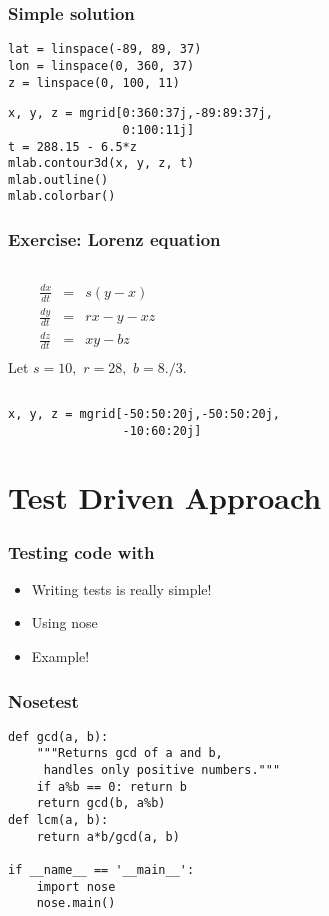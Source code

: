 \documentclass[compress,14pt]{beamer}
\newcounter{time}
\newcommand{\inctime}[1]{\addtocounter{time}{#1}{\vspace*{0.1in}\tiny \thetime\ m}}
\begin{document}
\begin{frame}[fragile]
    \frametitle{Simple solution}

    \begin{lstlisting}
lat = linspace(-89, 89, 37)
lon = linspace(0, 360, 37)
z = linspace(0, 100, 11)
    \end{lstlisting}
\pause
    \begin{lstlisting}
x, y, z = mgrid[0:360:37j,-89:89:37j,
                0:100:11j]
t = 288.15 - 6.5*z
mlab.contour3d(x, y, z, t)
mlab.outline()
mlab.colorbar()
    \end{lstlisting}
\end{frame}

\begin{frame}[fragile]
    \frametitle{Exercise: Lorenz equation}
    \begin{columns}
        \begin{eqnarray*}
        \frac{d x}{dt} &=& s (y-x)\\
        \frac{d y}{d t} &=& rx -y -xz\\
        \frac{d z}{d t} &=& xy - bz\\
        \end{eqnarray*}
        Let $s=10,$
        $r=28,$ 
        $b=8./3.$
    \end{columns}
  \begin{lstlisting}
x, y, z = mgrid[-50:50:20j,-50:50:20j,
                -10:60:20j]
  \end{lstlisting}
\inctime{20}
\end{frame}

\section{Test Driven Approach}

\begin{frame}[fragile]
    \frametitle{Testing code with }
   
    \begin{itemize}
        \item Writing tests is really simple!

        \item Using nose

        \item Example!
    \end{itemize}
\end{frame}

\begin{frame}[fragile]
    \frametitle{Nosetest}
\begin{lstlisting}
def gcd(a, b):
    """Returns gcd of a and b, 
     handles only positive numbers."""
    if a%b == 0: return b
    return gcd(b, a%b)
def lcm(a, b):
    return a*b/gcd(a, b)

if __name__ == '__main__':
    import nose
    nose.main()
\end{lstlisting}

    \inctime{10} 
\end{frame}
\end{document}

